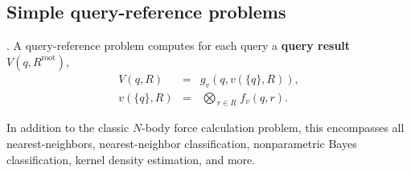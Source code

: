 \documentclass[twoside,leqno,twocolumn]{article}
\newcommand{\bigvec}[1]{\mathop{\overrightarrow{#1}}}
\newcommand{\summary}{\delta}
\newcommand{\mysub}[1]{\subsection{#1}. }
\newcommand{\defterm}[1]{{\bf #1}}
\newcommand{\kdroot}[1]{#1^{\text{root}}}
\newcommand{\lo}[1]{#1^{l}}
\newcommand{\up}[1]{#1^{u}}
\newcommand{\distlo}{\lo{d}}
\newcommand{\distup}{\up{d}}
\newcommand{\nameOp}[2]{\mathop{#1\nolimits\!\!_{#2}}}
\newcommand{\nameop}[2]{#1_{\!#2}}
\newcommand{\myOp}[1]{\nameOp{\bigotimes}{#1}}
\newcommand{\myop}[1]{\nameop{\otimes}{#1}}
\newcommand{\letterglob}{\psi}
\newcommand{\canpruneglob}{C_{\letterglob}}
\newcommand{\deltaglob}{\summary_{\letterglob}}
\newcommand{\letterqr}{v}
\newcommand{\outqr}{V}
\newcommand{\Opqr}{\myOp{\letterqr}}
\newcommand{\fqr}{f_{\letterqr}}
\newcommand{\gqr}{g_{\letterqr}}
\newcommand{\inqrv}{v}
\newcommand{\letterstat}{s}
\newcommand{\outstat}{\sigma}
\newcommand{\opstat}{\myop{\letterstat}}
\newcommand{\fstat}{f_{\letterstat}}
\begin{document}
%


\mysub{Simple query-reference problems}
A query-reference problem computes for each query a \defterm{query result} $\outqr(q, \kdroot{R})$,
\begin{eqnarray}
\outqr(q, R) &=& \gqr(q, \inqrv(\{q\}, R)),
\\
\inqrv(\{q\}, R) &=& \Opqr_{r \in R} \fqr(q, r).
\label{eqn:qrdef}
\end{eqnarray}

\noindent
In addition to the classic $N$-body force calculation problem, this encompasses all nearest-neighbors, nearest-neighbor classification, nonparametric Bayes classification, kernel density estimation, and more.
\end{document}

